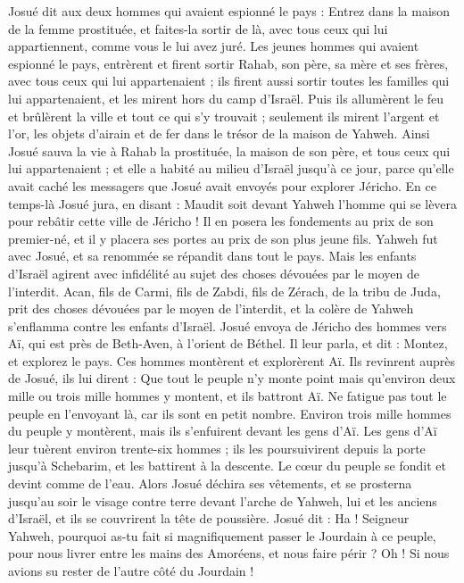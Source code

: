 \begin{multicols}{2}
Josué dit aux deux hommes qui avaient espionné le pays : Entrez dans la maison de la femme prostituée, et faites-la sortir de là, avec tous ceux qui lui appartiennent, comme vous le lui avez juré.
Les jeunes hommes qui avaient espionné le pays, entrèrent et firent sortir Rahab, son père, sa mère et ses frères, avec tous ceux qui lui appartenaient ; ils firent aussi sortir toutes les familles qui lui appartenaient, et les mirent hors du camp d’Israël.
Puis ils allumèrent le feu et brûlèrent la ville et tout ce qui s’y trouvait ; seulement ils mirent l’argent et l’or, les objets d’airain et de fer dans le trésor de la maison de Yahweh.
Ainsi Josué sauva la vie à Rahab la prostituée, la maison de son père, et tous ceux qui lui appartenaient ; et elle a habité au milieu d’Israël jusqu’à ce jour, parce qu’elle avait caché les messagers que Josué avait envoyés pour explorer Jéricho.
En ce temps-là Josué jura, en disant : Maudit soit devant Yahweh l’homme qui se lèvera pour rebâtir cette ville de Jéricho ! Il en posera les fondements au prix de son premier-né, et il y placera ses portes au prix de son plus jeune fils.
Yahweh fut avec Josué, et sa renommée se répandit dans tout le pays.
\VerseOne{}Mais les enfants d’Israël agirent avec infidélité au sujet des choses dévouées par le moyen de l'interdit. Acan, fils de Carmi, fils de Zabdi, fils de Zérach, de la tribu de Juda, prit des choses dévouées par le moyen de l'interdit, et la colère de Yahweh s’enflamma contre les enfants d’Israël.
Josué envoya de Jéricho des hommes vers Aï, qui est près de Beth-Aven, à l’orient de Béthel. Il leur parla, et dit : Montez, et explorez le pays. Ces hommes montèrent et explorèrent Aï.
Ils revinrent auprès de Josué, ils lui dirent : Que tout le peuple n’y monte point mais qu’environ deux mille ou trois mille hommes y montent, et ils battront Aï. Ne fatigue pas tout le peuple en l’envoyant là, car ils sont en petit nombre.
Environ trois mille hommes du peuple y montèrent, mais ils s’enfuirent devant les gens d’Aï.
Les gens d’Aï leur tuèrent environ trente-six hommes ; ils les poursuivirent depuis la porte jusqu’à Schebarim, et les battirent à la descente. Le cœur du peuple se fondit et devint comme de l’eau.
Alors Josué déchira ses vêtements, et se prosterna jusqu’au soir le visage contre terre devant l’arche de Yahweh, lui et les anciens d’Israël, et ils se couvrirent la tête de poussière.
Josué dit : Ha ! Seigneur Yahweh, pourquoi as-tu fait si magnifiquement passer le Jourdain à ce peuple, pour nous livrer entre les mains des Amoréens, et nous faire périr ? Oh ! Si nous avions su rester de l’autre côté du Jourdain !

\end{multicols}
